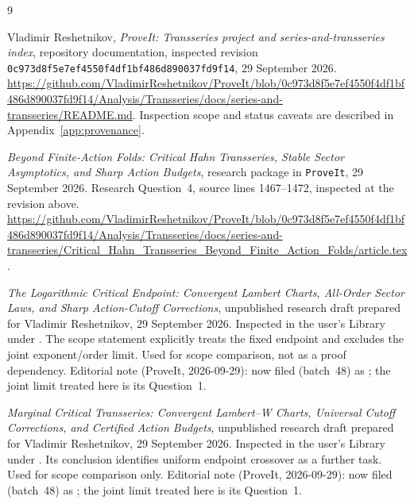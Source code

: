 \documentclass[11pt,a4paper]{article}
\numberwithin{equation}{section}
\theoremstyle{definition}
\theoremstyle{remark}
\begin{document}
{}
\begin{thebibliography}{9}

Vladimir Reshetnikov, \emph{ProveIt: Transseries project and
series-and-transseries index}, repository documentation, inspected revision
\texttt{0c973d8f5e7ef4550f4df1bf486d890037fd9f14}, 29 September 2026.
\url{https://github.com/VladimirReshetnikov/ProveIt/blob/0c973d8f5e7ef4550f4df1bf486d890037fd9f14/Analysis/Transseries/docs/series-and-transseries/README.md}.
Inspection scope and status caveats are described in Appendix~\ref{app:provenance}.

\emph{Beyond Finite-Action Folds: Critical Hahn Transseries, Stable Sector
Asymptotics, and Sharp Action Budgets}, research package in \texttt{ProveIt},
29 September 2026. Research Question~4, source lines 1467--1472, inspected at
the revision above.
\url{https://github.com/VladimirReshetnikov/ProveIt/blob/0c973d8f5e7ef4550f4df1bf486d890037fd9f14/Analysis/Transseries/docs/series-and-transseries/Critical_Hahn_Transseries_Beyond_Finite_Action_Folds/article.tex}.

\emph{The Logarithmic Critical Endpoint: Convergent Lambert Charts,
All-Order Sector Laws, and Sharp Action-Cutoff Corrections}, unpublished
research draft prepared for Vladimir Reshetnikov, 29 September 2026.
Inspected in the user's Library under
. The scope statement explicitly treats
the fixed endpoint and excludes the joint exponent/order limit. Used for
scope comparison, not as a proof dependency.
Editorial note (ProveIt, 2026-09-29): now filed (batch~48) as
;
the joint limit treated here is its Question~1.

\emph{Marginal Critical Transseries: Convergent Lambert--W Charts,
Universal Cutoff Corrections, and Certified Action Budgets}, unpublished
research draft prepared for Vladimir Reshetnikov, 29 September 2026.
Inspected in the user's Library under
. Its conclusion identifies uniform
endpoint crossover as a further task. Used for scope comparison only.
Editorial note (ProveIt, 2026-09-29): now filed (batch~48) as
;
the joint limit treated here is its Question~1.


\end{thebibliography}
\end{document}
